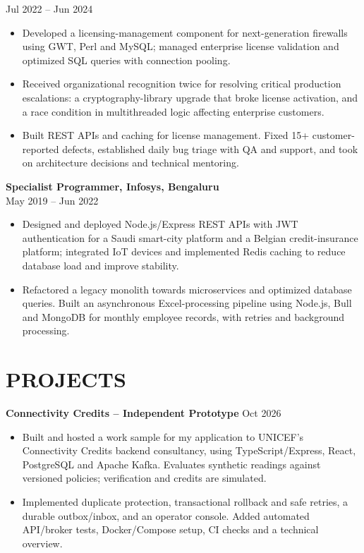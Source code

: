 \documentclass[10pt]{article}
\begin{document}
Jul 2022 -- Jun 2024
\begin{itemize}
  \item Developed a licensing-management component for next-generation firewalls using GWT, Perl and MySQL; managed enterprise license validation and optimized SQL queries with connection pooling.
  \item Received organizational recognition twice for resolving critical production escalations: a cryptography-library upgrade that broke license activation, and a race condition in multithreaded logic affecting enterprise customers.
  \item Built REST APIs and caching for license management. Fixed 15+ customer-reported defects, established daily bug triage with QA and support, and took on architecture decisions and technical mentoring.
\end{itemize}
\vspace{4pt}
\textbf{Specialist Programmer, Infosys, Bengaluru}\\
May 2019 -- Jun 2022
\begin{itemize}
  \item Designed and deployed Node.js/Express REST APIs with JWT authentication for a Saudi smart-city platform and a Belgian credit-insurance platform; integrated IoT devices and implemented Redis caching to reduce database load and improve stability.
  \item Refactored a legacy monolith towards microservices and optimized database queries. Built an asynchronous Excel-processing pipeline using Node.js, Bull and MongoDB for monthly employee records, with retries and background processing.
\end{itemize}

\section*{PROJECTS}
\textbf{Connectivity Credits -- Independent Prototype} \hfill Oct 2026
\begin{itemize}
  \item Built and hosted a work sample for my application to UNICEF's Connectivity Credits backend consultancy, using TypeScript/Express, React, PostgreSQL and Apache Kafka. Evaluates synthetic readings against versioned policies; verification and credits are simulated.
  \item Implemented duplicate protection, transactional rollback and safe retries, a durable outbox/inbox, and an operator console. Added automated API/broker tests, Docker/Compose setup, CI checks and a technical overview.
\end{itemize}
\end{document}
